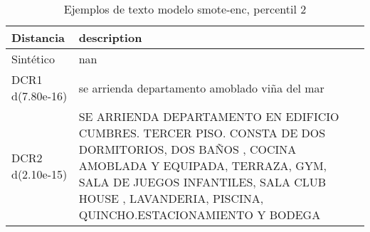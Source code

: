 \begin{table}[H]
\centering
\fontsize{10}{14}\selectfont
\caption{Ejemplos de texto modelo smote-enc, percentil 2}
\label{table-example-economicos-b-1-smote-enc-2p-text}
\begin{tabular}{|l|m{35em}|}
\hline
\rowcolor[gray]{0.8}
Distancia & description \\
\hline Sintético & nan \\
\hline DCR1 d(7.80e-16) & se  arrienda  departamento  amoblado  vi\~na del mar \\
\hline DCR2 d(2.10e-15) & SE ARRIENDA DEPARTAMENTO EN EDIFICIO CUMBRES. TERCER PISO. CONSTA DE DOS DORMITORIOS, DOS BA\~NOS , COCINA AMOBLADA Y EQUIPADA, TERRAZA, GYM, SALA DE JUEGOS INFANTILES, SALA CLUB HOUSE , LAVANDERIA, PISCINA, QUINCHO.ESTACIONAMIENTO Y BODEGA \\
\hline
\end{tabular}
\end{table}
